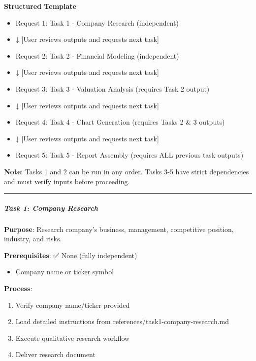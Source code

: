 \documentclass[11pt]{article}
\begin{document}
\textbf{Structured Template}
\begin{itemize}[leftmargin=*,itemsep=2pt,topsep=2pt]
\item {} Request 1: Task 1 - Company Research (independent)
\item {} ↓ [User reviews outputs and requests next task]
\item {} Request 2: Task 2 - Financial Modeling (independent)
\item {} ↓ [User reviews outputs and requests next task]
\item {} Request 3: Task 3 - Valuation Analysis (requires Task 2 output)
\item {} ↓ [User reviews outputs and requests next task]
\item {} Request 4: Task 4 - Chart Generation (requires Tasks 2 \& 3 outputs)
\item {} ↓ [User reviews outputs and requests next task]
\item {} Request 5: Task 5 - Report Assembly (requires ALL previous task outputs)
\end{itemize}

\textbf{Note}: Tasks 1 and 2 can be run in any order. Tasks 3-5 have strict dependencies and must verify inputs before proceeding.


\vspace{0.5em}\hrule\vspace{0.5em}

\subparagraph{Task 1: Company Research}\mbox{}\par

\textbf{Purpose}: Research company's business, management, competitive position, industry, and risks.


\textbf{Prerequisites}: ✅ None (fully independent)

\begin{itemize}[leftmargin=*,itemsep=2pt,topsep=2pt]
\item {} Company name or ticker symbol
\end{itemize}

\textbf{Process}:

\begin{enumerate}[leftmargin=*,itemsep=2pt,topsep=2pt]
\item {} Verify company name/ticker provided
\item {} Load detailed instructions from references/task1-company-research.md
\item {} Execute qualitative research workflow
\item {} Deliver research document
\end{enumerate}
\end{document}
